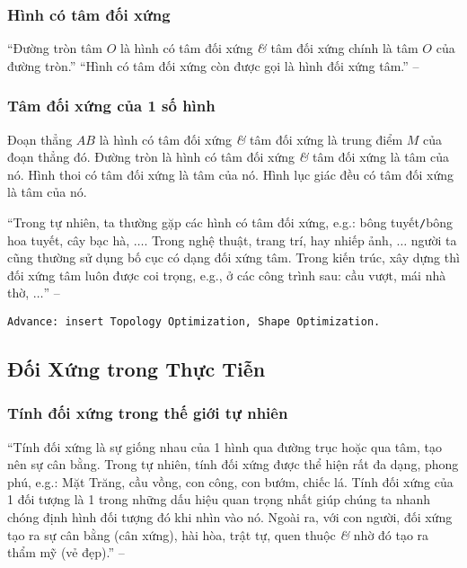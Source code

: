 \documentclass{article}
\numberwithin{equation}{section}
\begin{document}
\subsubsection{Hình có tâm đối xứng}
``Đường tròn tâm $O$ là hình có tâm đối xứng \textit{\&} tâm đối xứng chính là tâm $O$ của đường tròn.'' ``Hình có tâm đối xứng còn được gọi là hình đối xứng tâm.'' -- \cite[p. 111]{Thai_Anh_Dat_Ha_Loan_Nam_Quang_Toan_6_tap_1}

\subsubsection{Tâm đối xứng của 1 số hình}
Đoạn thẳng $AB$ là hình có tâm đối xứng \textit{\&} tâm đối xứng là trung điểm $M$ của đoạn thẳng đó. Đường tròn là hình có tâm đối xứng \textit{\&} tâm đối xứng là tâm của nó. Hình thoi có tâm đối xứng là tâm của nó. Hình lục giác đều có tâm đối xứng là tâm của nó.

``Trong tự nhiên, ta thường gặp các hình có tâm đối xứng, e.g.: bông tuyết\texttt{/}bông hoa tuyết, cây bạc hà, $\ldots$. Trong nghệ thuật, trang trí, hay nhiếp ảnh, $\ldots$ người ta cũng thường sử dụng bố cục có dạng đối xứng tâm. Trong kiến trúc, xây dựng thì đối xứng tâm luôn được coi trọng, e.g., ở các công trình sau: cầu vượt, mái nhà thờ, $\ldots$'' -- \cite[p. 113]{Thai_Anh_Dat_Ha_Loan_Nam_Quang_Toan_6_tap_1}

\texttt{Advance: insert Topology Optimization, Shape Optimization.}

\subsection{Đối Xứng trong Thực Tiễn}

\subsubsection{Tính đối xứng trong thế giới tự nhiên}
``Tính đối xứng là sự giống nhau của 1 hình qua đường trục hoặc qua tâm, tạo nên sự cân bằng. Trong tự nhiên, tính đối xứng được thể hiện rất đa dạng, phong phú, e.g.: Mặt Trăng, cầu vồng, con công, con bướm, chiếc lá. Tính đối xứng của 1 đối tượng là 1 trong những dấu hiệu quan trọng nhất giúp chúng ta nhanh chóng định hình đối tượng đó khi nhìn vào nó. Ngoài ra, với con người, đối xứng tạo ra sự cân bằng (cân xứng), hài hòa, trật tự, quen thuộc \textit{\&} nhờ đó tạo ra thẩm mỹ (vẻ đẹp).'' -- \cite[p. 114]{Thai_Anh_Dat_Ha_Loan_Nam_Quang_Toan_6_tap_1}
\end{document}
